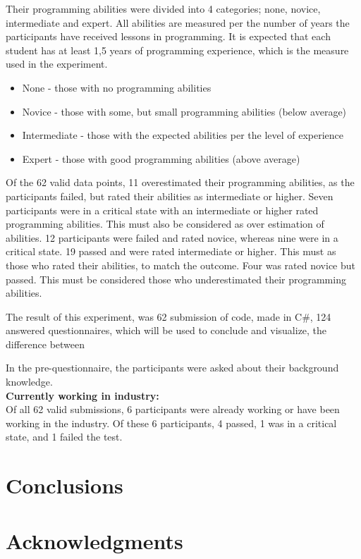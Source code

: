 \documentclass{sig-alternate-05-2015}
\begin{document}
Their programming abilities were divided into 4 categories; none, novice, intermediate and expert. All abilities are measured per the number of years the participants have received lessons in programming. It is expected that each student has at least 1,5 years of programming experience, which is the measure used in the experiment.
\begin{itemize}
	\item None - those with no programming abilities
	\item Novice - those with some, but small programming abilities (below average)
	\item Intermediate - those with the expected abilities per the level of experience
	\item Expert - those with good programming abilities (above average)
\end{itemize}

Of the 62 valid data points, 11 overestimated their programming abilities, as the participants failed, but rated their abilities as intermediate or higher. Seven participants were in a critical state with an intermediate or higher rated programming abilities. This must also be considered as over estimation of abilities.
12 participants were failed and rated novice, whereas nine were in a critical state. 19 passed and were rated intermediate or higher. This must as those who rated their abilities, to match the outcome.
Four was rated novice but passed. This must be considered those who underestimated their programming abilities.

The result of this experiment, was 62 submission of code, made in C{\#}, 124 answered questionnaires, which will be used to conclude and visualize, the difference between

In the pre-questionnaire, the participants were asked about their background knowledge. \\

\textbf{Currently working in industry:}\\
Of all 62 valid submissions, 6 participants were already working or have been working in the industry. Of these 6 participants, 4 passed, 1 was in a critical state, and 1 failed the test.

\section{Conclusions}

\section{Acknowledgments}
\end{document}
